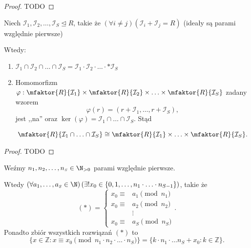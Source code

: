 \begin{proof}
	TODO
\end{proof} 
\begin{definition}
	Niech $\mathcal{I}_{1}, \mathcal{I}_{2},\ldots, \mathcal{I}_{S}\unlhd R$, takie że $\left(\forall i\neq j \right)\left( \mathcal{I}_{i}+ \mathcal{I}_{j} =R \right)  $ (ideały są parami względnie pierwsze)

	Wtedy:
	\begin{enumerate}[label=\arabic*)]
		\item $\mathcal{I}_{1} \cap \mathcal{I}_{2} \cap \ldots \cap \mathcal{I}_{S} = \mathcal{I}_{1}\cdot \mathcal{I}_{2} \cdot \ldots\cdot * \mathcal{I}_{S}$
		\item Homomorfizm $\varphi : \mfaktor{R}{\mathcal{I}_{1}} \times \mfaktor{R}{\mathcal{I}_{2}} \times \ldots \times \mfaktor{R}{\mathcal{I}_{S}}  $ zadany wzorem
			\[
			\varphi \left( r \right) = \left( r + \mathcal{I}_{1},\ldots, r+\mathcal{I}_{S} \right) 
			,\] 
			jest ,,na'' oraz $\ker(\varphi  ) = \mathcal{I}_{1} \cap \ldots \cap \mathcal{I}_{S}$. Stąd

			\[
			\mfaktor{R}{\mathcal{I}_{1}\cap \ldots \cap \mathcal{I}_{S}} \cong \mfaktor{R}{\mathcal{I}_{1}} \times \ldots\times \mfaktor{R}{\mathcal{I}_{S}} 
			.\] 
	\end{enumerate}
\end{definition} 
\begin{proof}
	TODO
\end{proof} 
\begin{corollary}
	Weźmy $n_1,n_2,\ldots,n_{\scriptscriptstyle S} \in \N_{>0}$ parami względnie pierwsze.

	Wtedy $\left(\forall a_1,\ldots,a_{\scriptscriptstyle S}\in \N \right)\left(\exists ! x_0\in \{0,1,\ldots,n_1\cdot \ldots\cdot n_{S-1}\}  \right)  $, takie że
	\[
		\left( \ast  \right) = \begin{cases}
			x_0 \equiv &a_1 \pmod{n_1} \\
			x_0 \equiv &a_2 \pmod{n_2} \\
			     &\vdots \\
			x_0 \equiv &a_{\scriptscriptstyle S} \pmod{n_{\scriptscriptstyle S}} 
		\end{cases}
	.\] 
	Ponadto zbiór wszystkich rozwiązań $\left( \ast  \right) $ to
	\[
	\{x\in \mathbb{Z} : x \equiv x_0 \pmod{n_1\cdot n_2\cdot \ldots\cdot n_{\scriptscriptstyle S}} \} = \{k\cdot n_1\cdot \ldots n_{\scriptscriptstyle S} + x_0: k\in \mathbb{Z} \} 
	.\] 
\end{corollary}
